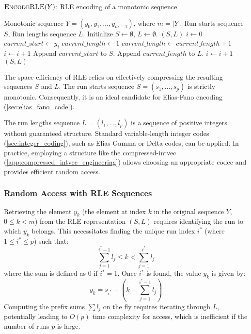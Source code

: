 \begin{algorithm}[htbp]
    \caption{$\textsc{EncodeRLE}(Y)$: RLE encoding of a monotonic sequence}
    \label{alg:rle_encode}
    \small
    \begin{algorithmic}[1]
        \Require Monotonic sequence $Y = (y_0, y_1, \dots, y_{m-1})$, where $m = |Y|$.
        \Ensure Run starts sequence $S$, Run lengths sequence $L$.
        \State Initialize $S \leftarrow \emptyset$, $L \leftarrow \emptyset$.
        \State \Return $(S, L)$
        \EndIf
        \State $i \leftarrow 0$
        \State $current\_start \leftarrow y_i$
        \State $current\_length \leftarrow 1$
        \State $current\_length \leftarrow current\_length + 1$
        \State $i \leftarrow i + 1$
        \EndWhile
        \State Append $current\_start$ to $S$.
        \State Append $current\_length$ to $L$.
        \State $i \leftarrow i + 1$
        \EndWhile
        \State \Return $(S, L)$
    \end{algorithmic}
\end{algorithm}

The space efficiency of RLE relies on effectively compressing the resulting sequences $S$ and $L$.
The run starts sequence $S = (s_1, \dots, s_p)$ is strictly monotonic. Consequently, it is an ideal candidate for Elias-Fano encoding (\autoref{sec:elias_fano_code}).

The run lengths sequence $L = (l_1, \dots, l_p)$ is a sequence of positive integers without guaranteed structure. Standard variable-length integer codes (\autoref{sec:integer_coding}), such as Elias Gamma or Delta codes, can be applied. In practice, employing a structure like the \textsf{compressed-intvec} (\autoref{app:compressed_intvec_engineering}) allows choosing an appropriate codec and provides efficient random access.

\subsubsection*{Random Access with RLE Sequences}
Retrieving the element $y_k$ (the element at index $k$ in the original sequence $Y$, $0 \le k < m$) from the RLE representation $(S, L)$ requires identifying the run to which $y_k$ belongs. This necessitates finding the unique run index $i^*$ (where $1 \le i^* \le p$) such that:
\[ \sum_{j=1}^{i^*-1} l_j \le k < \sum_{j=1}^{i^*} l_j \]
where the sum is defined as $0$ if $i^*=1$. Once $i^*$ is found, the value $y_k$ is given by:
\[ y_k = s_{i^*} + \left( k - \sum_{j=1}^{i^*-1} l_j \right) \]
Computing the prefix sums $\sum l_j$ on the fly requires iterating through $L$, potentially leading to $O(p)$ time complexity for access, which is inefficient if the number of runs $p$ is large.

